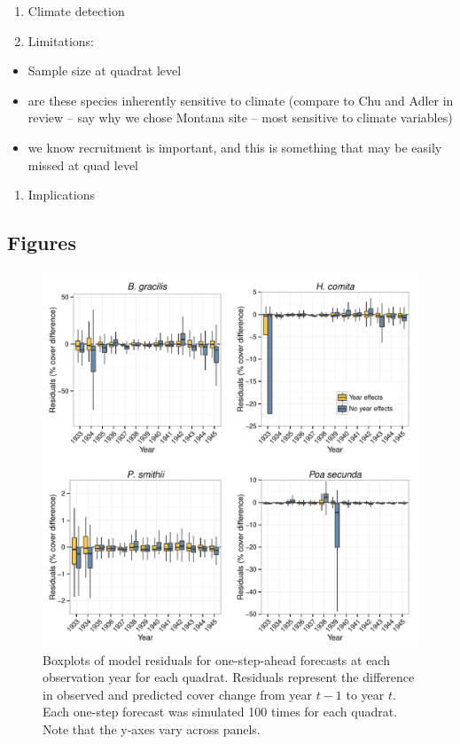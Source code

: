 \documentclass[12pt,]{article}
\begin{document}
\begin{enumerate}
\def\labelenumi{\arabic{enumi}.}
\itemsep1pt\parskip0pt
\item
  Climate detection
\item
  Limitations:
\end{enumerate}

\begin{itemize}
\itemsep1pt\parskip0pt
\item
  Sample size at quadrat level
\item
  are these species inherently sensitive to climate (compare to Chu and
  Adler in review -- say why we chose Montana site -- most sensitive to
  climate variables)
\item
  we know recruitment is important, and this is something that may be
  easily missed at quad level
\end{itemize}

\begin{enumerate}
\def\labelenumi{\arabic{enumi}.}
\setcounter{enumi}{2}
\itemsep1pt\parskip0pt
\item
  Implications
\end{enumerate}

\pagebreak{}

\subsection{Figures}\label{figures}

\begin{figure}[htbp]
\centering
\includegraphics{components/figure/manuscript-figure_1.pdf}
\caption{Boxplots of model residuals for one-step-ahead forecasts at
each observation year for each quadrat. Residuals represent the
difference in observed and predicted cover change from year $t-1$ to
year $t$. Each one-step forecast was simulated 100 times for each
quadrat. Note that the y-axes vary across panels.}
\end{figure}
\end{document}
